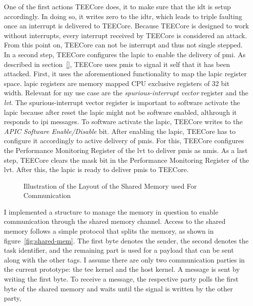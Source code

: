 One of the first actions TEECore does, it to make sure that the \gls{idt} is
setup accordingly. In doing so, it writes zero to the \gls{idtr}, which leads to
triple faulting once an interrupt is delivered to TEECore. Because TEECore is
designed to work without interrupts, every interrupt received by TEECore is
considered an attack. From this point on, TEECore can not be interrupt and thus
not single stepped. In a second step, TEECore configures the \gls{lapic} to
enable the delivery of \gls{pmi}. As described in section~\ref{}\todo{}, TEECore
uses \glspl{pmi} to signal it self that it has been attacked. First, it uses the
aforementioned functionality to map the \gls{lapic} register space. \gls{lapic}
registers are memory mapped CPU exclusive registers of 32 bit width. Relevant
for my use case are the \textit{spurious-interrupt vector} register and the
\textit{\gls{lvt}}. The spurious-interrupt vector register is important to
software activate the \gls{lapic} because after reset the \gls{lapic} might not
be software enabled, althrough it responds to \gls{ipi} messages. To software
activate the \gls{lapic}, TEECore writes to the \textit{APIC Software
    Enable/Disable} bit. After enabling the \gls{lapic}, TEECore has to configure it
accordingly to active delivery of \glspl{pmi}. For this, TEECore configures the
Performance Monitoring Register of the \gls{lvt} to deliver \glspl{pmi} as
\glspl{nmi}. As a last step, TEECore clears the mask bit in the Performance
Monitoring Register of the \gls{lvt}. After this, the \gls{lapic} is ready to
deliver \glspl{pmi} to TEECore.\\

\begin{center}
    \begin{figure}
        \centering
        
        \caption{Illustration of the Layout of the Shared Memory used For Communication}
        \label{fig:state:technical:paging}
    \end{figure}
\end{center}

I implemented a structure to manage the memory in question to enable
communication through the shared memory channel. Access to the shared memory
follows a simple protocol that splits the memory, as shown in
figure~\ref{fig:shared-mem}. The first byte denotes the sender, the second
denotes the task identifier, and the remaining part is used for a payload that
can be sent along with the other tags. I assume there are only two communication
parties in the current prototype: the \gls{tee} kernel and the host kernel. A
message is sent by writing the first byte. To receive a message, the respective
party polls the first byte of the shared memory and waits until the signal is
written by the other party, \\

